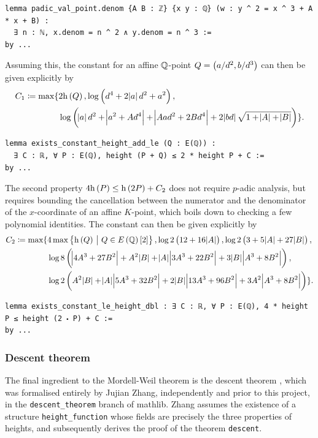 \begin{lstlisting}[frame=single]
lemma padic_val_point.denom {A B : ℤ} {x y : ℚ} (w : y ^ 2 = x ^ 3 + A * x + B) :
  ∃ n : ℕ, x.denom = n ^ 2 ∧ y.denom = n ^ 3 :=
by ...
\end{lstlisting}

Assuming this, the constant for an affine $ \mathbb{Q} $-point $ Q = \br{a / d^2, b / d^3} $ can then be given explicitly by
\begin{align*}
C_1 \coloneqq \max \{ & 2\h\br{Q}, \log \br{d^4 + 2\abs{a}d^2 + a^2}, \\
& \log \br{\abs{a}d^2 + \abs{a^2 + Ad^4} + \abs{Aad^2 + 2Bd^4} + 2\abs{bd}\sqrt{1 + \abs{A} + \abs{B}}} \}.
\end{align*}

\begin{lstlisting}[frame=single]
lemma exists_constant_height_add_le (Q : E(ℚ)) :
  ∃ C : ℝ, ∀ P : E(ℚ), height (P + Q) ≤ 2 * height P + C :=
by ...
\end{lstlisting}

The second property $ 4\h\br{P} \le \h\br{2P} + C_2 $ does not require $ p $-adic analysis, but requires bounding the cancellation between the numerator and the denominator of the $ x $-coordinate of an affine $ K $-point, which boils down to checking a few polynomial identities. The constant can then be given explicitly by
\begin{align*}
C_2 \coloneqq \max \{ & 4\max \cbr{\h\br{Q} \st Q \in E\br{\QQ}\sbr{2}}, \log 2\br{12 + 16\abs{A}}, \log 2\br{3 + 5\abs{A} + 27\abs{B}}, \\
& \log 8\br{\abs{4A^3 + 27B^2} + A^2\abs{B} + \abs{A}\abs{3A^3 + 22B^2} + 3\abs{B}\abs{A^3 + 8B^2}}, \\
& \log 2\br{A^2\abs{B} + \abs{A}\abs{5A^3 + 32B^2} + 2\abs{B}\abs{13A^3 + 96B^2} + 3A^2\abs{A^3 + 8B^2}} \}.
\end{align*}

\begin{lstlisting}[frame=single]
lemma exists_constant_le_height_dbl : ∃ C : ℝ, ∀ P : E(ℚ), 4 * height P ≤ height (2 ⬝ P) + C :=
by ...
\end{lstlisting}

\subsubsection{Descent theorem}

The final ingredient to the Mordell-Weil theorem is the descent theorem \cite[Theorem VIII.3.1]{Sil09}, which was formalised entirely by Jujian Zhang, independently and prior to this project, in the \texttt{descent\_theorem} branch of mathlib. Zhang assumes the existence of a structure \texttt{height\_function} whose fields are precisely the three properties of heights, and subsequently derives the proof of the theorem \texttt{descent}.

